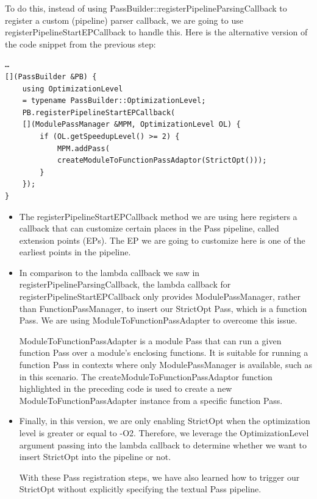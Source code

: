 \begin{enumerate}
To do this, instead of using PassBuilder::registerPipelineParsingCallback to register a custom (pipeline) parser callback, we are going to use  registerPipelineStartEPCallback to handle this. Here is the alternative version of the code snippet from the previous step:

\begin{lstlisting}[style=styleCXX]
…
[](PassBuilder &PB) {
	using OptimizationLevel
	= typename PassBuilder::OptimizationLevel;
	PB.registerPipelineStartEPCallback(
	[](ModulePassManager &MPM, OptimizationLevel OL) {
		if (OL.getSpeedupLevel() >= 2) {
			MPM.addPass(
			createModuleToFunctionPassAdaptor(StrictOpt()));
		}
	});
}
\end{lstlisting}

\begin{itemize}
\item The registerPipelineStartEPCallback method we are using here registers
a callback that can customize certain places in the Pass pipeline, called extension points (EPs). The EP we are going to customize here is one of the earliest points in the pipeline.

\item In comparison to the lambda callback we saw in registerPipelineParsingCallback, the lambda callback for registerPipelineStartEPCallback only provides ModulePassManager, rather than FunctionPassManager, to insert our StrictOpt Pass, which is a function Pass. We are using ModuleToFunctionPassAdapter to overcome this issue.

ModuleToFunctionPassAdapter is a module Pass that can run a given function Pass over a module's enclosing functions. It is suitable for running a function Pass in contexts where only ModulePassManager is available, such as in this scenario. The createModuleToFunctionPassAdaptor function highlighted in the preceding code is used to create a new  ModuleToFunctionPassAdapter instance from a specific function Pass.

\item Finally, in this version, we are only enabling StrictOpt when the optimization level is greater or equal to -O2. Therefore, we leverage the OptimizationLevel argument passing into the lambda callback to determine whether we want to insert StrictOpt into the pipeline or not.

With these Pass registration steps, we have also learned how to trigger our StrictOpt without explicitly specifying the textual Pass pipeline.
\end{itemize}


\end{enumerate}
